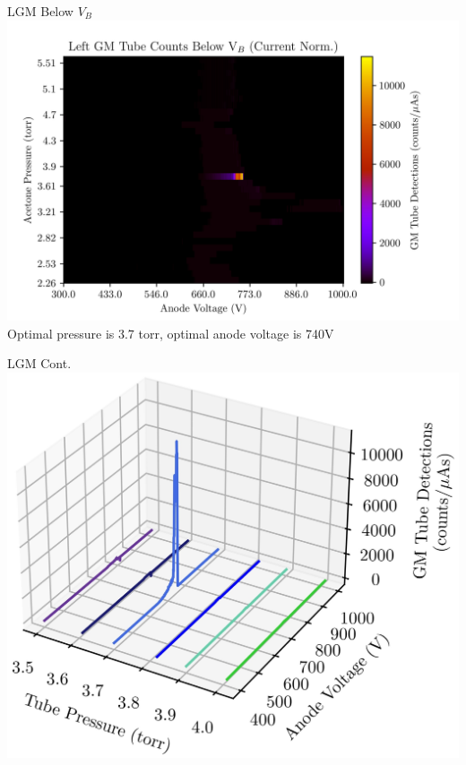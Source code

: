 \documentclass[12pt, aspectratio=169]{beamer}
\begin{document}
\begin{frame}{LGM Below $V_B$}
    \centering
    \includegraphics[scale=0.65]{Figs/LGMFinalNorm.jpg}\\
    Optimal pressure is 3.7 torr, optimal anode voltage is 740V
\end{frame}

\begin{frame}{LGM Cont.}
    \centering
    \includegraphics[scale=0.9]{Figs/Plots/LGM Waterfall.jpg}
\end{frame}
\end{document}
